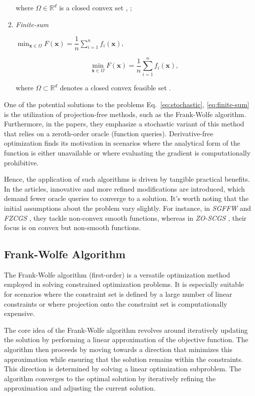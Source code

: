 \begin{multicols}{2}
\begin{enumerate}
    where $\Omega \in \mathbb{R}^d$ is a closed convex set \cite{sahu19a}, \cite{lobanov2023};
    
    \item \textit{Finite-sum} 
    
    $\min _{\mathbf{x} \in \Omega} F(\mathbf{x})=\dfrac{1}{n} \sum_{i=1}^n f_i(\mathbf{x})$, 
    
    \begin{equation}
        \min _{\mathbf{x} \in \Omega} F(\mathbf{x})=\dfrac{1}{n} \sum_{i=1}^n f_i(\mathbf{x}),
        \label{eq:finite-sum}
    \end{equation}

    where $\Omega \subset \mathbb{R}^d$ denotes a closed convex feasible set \cite{gao20b}.
\end{enumerate}

One of the potential solutions to the problems Eq.~\eqref{eq:stochastic}, \eqref{eq:finite-sum} 
is the utilization of projection-free methods, such as the Frank-Wolfe algorithm. 
Furthermore, in the papers, they emphasize a stochastic variant of this method that 
relies on a zeroth-order oracle (function queries). Derivative-free optimization finds 
its motivation in scenarios where the analytical form of the function is either 
unavailable or where evaluating the gradient is computationally prohibitive.

Hence, the application of such algorithms is driven by tangible practical benefits. 
In the articles, innovative and more refined modifications are introduced, 
which demand fewer oracle queries to converge to a solution. It's worth noting 
that the initial assumptions about the problem vary slightly. For instance, 
in \textit{SGFFW} \cite{sahu19a}  and \textit{FZCGS} \cite{gao20b}, they tackle non-convex smooth
functions, whereas in \textit{ZO-SCGS} \cite{lobanov2023}, their focus is on convex but non-smooth functions.


\subsection{Frank-Wolfe Algorithm}

The Frank-Wolfe algorithm (first-order) is a versatile optimization method employed in solving 
constrained optimization problems. It is especially suitable for scenarios where 
the constraint set is defined by a large number of linear constraints or 
where projection onto the constraint set is computationally expensive.

The core idea of the Frank-Wolfe algorithm revolves around iteratively 
updating the solution by performing a linear approximation of the objective function. 
The algorithm then proceeds by moving towards a direction that minimizes 
this approximation while ensuring that the solution remains within the constraints. 
This direction is determined by solving a linear optimization subproblem. 
The algorithm converges to the optimal solution by iteratively refining 
the approximation and adjusting the current solution.


\end{multicols}

